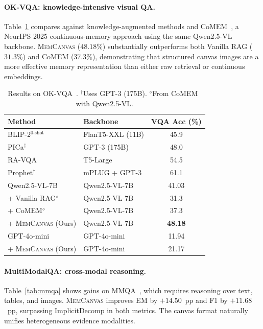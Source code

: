 \documentclass{article}
\newcommand{\memcanvas}{\textsc{MemCanvas}}
\begin{document}
\paragraph{OK-VQA: knowledge-intensive visual QA.}
Table~\ref{tab:okvqa} compares against knowledge-augmented methods and CoMEM~\citep{wu2025comem}, a NeurIPS 2025 continuous-memory approach using the same Qwen2.5-VL backbone. \memcanvas{} ($48.18\%$) substantially outperforms both Vanilla RAG ($31.3\%$) and CoMEM ($37.3\%$), demonstrating that structured canvas images are a more effective memory representation than either raw retrieval or continuous embeddings.

\begin{table}[t]
  \centering
  \caption{Results on OK-VQA~\citep{marino2019okvqa}. $^\dagger$Uses GPT-3 (175B). $^\diamond$From CoMEM~\citep{wu2025comem} with Qwen2.5-VL.}
  \label{tab:okvqa}
  \begin{tabular}{@{}llc@{}}
    \toprule
    \textbf{Method} & \textbf{Backbone} & \textbf{VQA Acc (\%)} \\
    \midrule
    BLIP-2$^{0\text{-shot}}$~\citep{li2023blip2} & FlanT5-XXL (11B) & 45.9 \\
    PICa$^\dagger$~\citep{yang2022pica} & GPT-3 (175B) & 48.0 \\
    RA-VQA~\citep{lin2022ravqa} & T5-Large & 54.5 \\
    Prophet$^\dagger$~\citep{shao2023prophet} & mPLUG + GPT-3 & 61.1 \\
    \midrule
    Qwen2.5-VL-7B                           & Qwen2.5-VL-7B & 41.03 \\
    \;\;+ Vanilla RAG$^\diamond$             & Qwen2.5-VL-7B & 31.3 \\
    \;\;+ CoMEM$^\diamond$~\citep{wu2025comem} & Qwen2.5-VL-7B & 37.3 \\
    \;\;+ \memcanvas{} (Ours)                & Qwen2.5-VL-7B & \textbf{48.18} \\
    \midrule
    GPT-4o-mini                              & GPT-4o-mini    & 11.94 \\
    \;\;+ \memcanvas{} (Ours)                & GPT-4o-mini    & 21.17 \\
    \bottomrule
  \end{tabular}
\end{table}

\paragraph{MultiModalQA: cross-modal reasoning.}
Table~\ref{tab:mmqa} shows gains on MMQA~\citep{talmor2021multimodalqa}, which requires reasoning over text, tables, and images. \memcanvas{} improves EM by $+14.50$~pp and F1 by $+11.68$~pp, surpassing ImplicitDecomp in both metrics. The canvas format naturally unifies heterogeneous evidence modalities.
\end{document}
